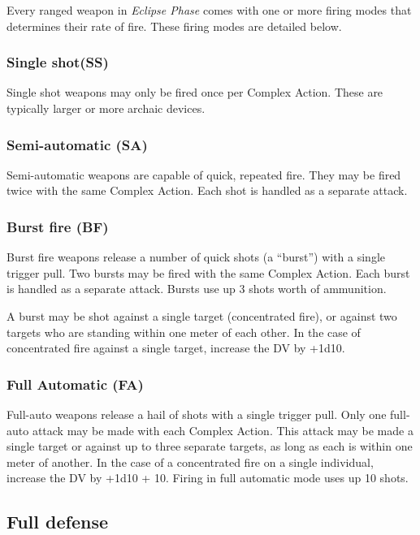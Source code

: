 Every ranged weapon in \emph{Eclipse Phase} comes with one or more firing modes that determines their rate of fire. These firing modes are detailed below. 

\subsubsection{Single shot(SS)} 

Single shot weapons may only be fired once per Complex Action. These are typically larger or more archaic devices. 

\subsubsection{Semi-automatic (SA)} 

Semi-automatic weapons are capable of quick, repeated fire. They may be fired twice with the same Complex Action. Each shot is handled as a separate attack. 

\subsubsection{Burst fire (BF)} 

Burst fire weapons release a number of quick shots (a ``burst”) with a single trigger pull. Two bursts may be fired with the same Complex Action. Each burst is handled as a separate attack. Bursts use up 3 shots worth of ammunition. 

A burst may be shot against a single target (concentrated fire), or against two targets who are standing within one meter of each other. In the case of concentrated fire against a single target, increase the DV by +1d10. 

\subsubsection{Full Automatic (FA)} 

Full-auto weapons release a hail of shots with a single trigger pull. Only one full-auto attack may be made with each Complex Action. This attack may be made a single target or against up to three separate targets, as long as each is within one meter of another. In the case of a concentrated fire on a single individual, increase the DV by +1d10 + 10. Firing in full automatic mode uses up 10 shots. 



\subsection{Full defense} \label{sec:full-defense} 

